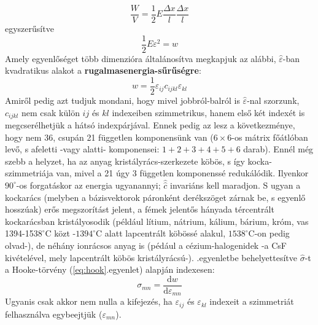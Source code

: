 \documentclass[a4paper, 12pt, titlepage]{article}
\begin{document}
\[\frac{W}{V}=\frac{1}{2}E\frac{\Delta x}{l}\frac{\Delta x}{l}\]
egyszerűsítve
\[\frac{1}{2}E\varepsilon^{2}=w\]
Amely egyenlőséget több dimenzióra általánosítva megkapjuk az alábbi, $\hat{\varepsilon}$-ban kvadratikus alakot a \textbf{rugalmasenergia-sűrűségre}:
	\begin{equation}
w=\frac{1}{2}\varepsilon_{ij}c_{ijkl}\varepsilon_{kl} %
	\label{eq:w}
	\end{equation}
Amiről pedig azt tudjuk mondani, hogy mivel jobbról-balról is $\hat{\varepsilon}$-nal szorzunk, $c_{ijkl}$ nem csak külön $ij$ és $kl$ indexeiben szimmetrikus, hanem első két indexét is megcserélhetjük a hátsó indexpárjával. Ennek pedig az lesz a következménye, hogy nem 36, csupán 21 független komponensünk van ($6\times 6$-os mátrix főátlóban levő, s afeletti -vagy alatti- komponensei: $1+2+3+4+5+6$ darab). Ennél még szebb a helyzet, ha az anyag kristályrács-szerkezete köbös, s így kocka-szimmetriája van, mivel a 21 úgy 3 független komponenssé redukálódik. Ilyenkor $90^{\circ}$-os forgatáskor az energia ugyanannyi; $\hat{\hat{c}}$ invariáns kell maradjon. S ugyan a kockarács (melyben a bázisvektorok páronként derékszöget zárnak be, s egyenlő hosszúak) erős megszorítást jelent, a fémek jelentős hányada tércentrált kockarácsban kristályosodik (például lítium, nátrium, kálium, bárium, króm, vas 1394-153$8^{\circ}$C közt -$1394^{\circ}$C alatt lapcentrált köbössé alakul, $1538^{\circ}$C-on pedig olvad-), de néhány ionrácsos anyag is (pédául a cézium-halogenidek -a CsF kivételével, mely lapcentrált köbös kristályrácsú-). %
\newline
{}.\hspace{1mm}egyenletbe behelyettesítve $\hat{\sigma}$-t a Hooke-törvény (\ref{eq:hook}.\hspace{1mm}egyenlet) alapján indexesen:
	\begin{equation}
\sigma_{mn}=\frac{\mathrm{d}w}{\mathrm{d}\varepsilon_{mn}} %
	\label{eq:sigmatort}
	\end{equation}
Ugyanis csak akkor nem nulla a kifejezés, ha $\varepsilon_{ij}$ és $\varepsilon_{kl}$ indexeit a szimmetriát felhasználva egybeejtjük ($\varepsilon_{mn}$).
\newline
\newline
\end{document}
